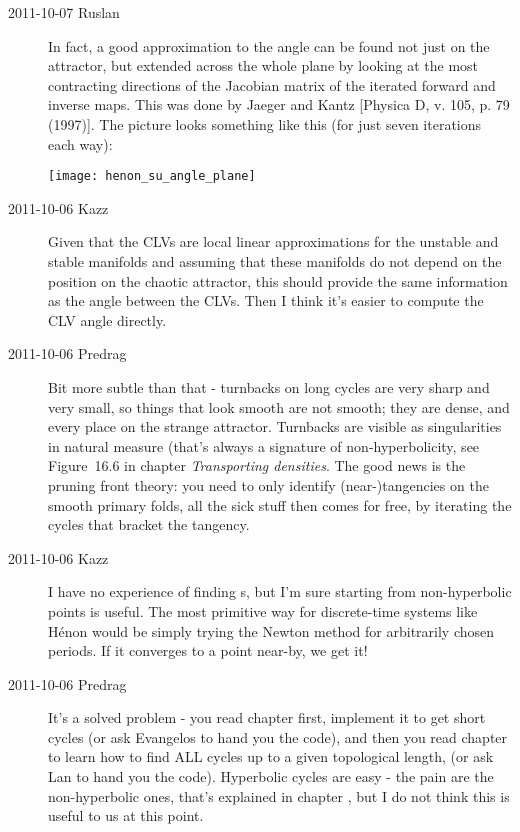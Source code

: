 \begin{description}
\item[2011-10-07 Ruslan] In fact, a good approximation to the angle can be found not just on the attractor, but extended across the whole plane by looking at the most contracting directions of the Jacobian matrix of the iterated forward and inverse maps.  This was done by Jaeger and Kantz [Physica D, v. 105, p. 79 (1997)].  The picture looks something like this (for just seven iterations each way):
    
    \texttt{[image: henon\_su\_angle\_plane]}
    

\item[2011-10-06 Kazz]
Given that the CLVs are local linear approximations for the unstable and
stable manifolds and assuming that these manifolds do not depend on the
position on the chaotic attractor, this should provide the same
information as the angle between the CLVs. Then I think it's easier to
compute the CLV angle directly.

\item[2011-10-06 Predrag]
Bit more subtle than that - turnbacks on long cycles are very sharp and
very small, so things that look smooth are not smooth; they are dense,
and every place on the strange attractor. Turnbacks are visible as
singularities in natural measure (that's always a signature of
non-hyperbolicity, see Figure~16.6 in
 chapter
{\em Transporting densities}. The good news is the pruning front theory:
you need to only identify (near-)tangencies on the smooth primary folds,
all the sick stuff then comes for free, by iterating the cycles that
bracket the tangency.

\item[2011-10-06 Kazz]
I have no experience of finding \po s, but I'm sure starting from
non-hyperbolic points is useful. The most primitive way for discrete-time
systems like H\'enon would be simply trying the Newton method for
arbitrarily chosen periods. If it converges to a point near-by, we get
it!

\item[2011-10-06 Predrag]
It's a solved problem - you read chapter
 first, implement it to get short cycles (or ask Evangelos to
hand you the code), and then you read chapter
to learn how to find ALL cycles up to a given topological length, (or ask
Lan to hand you the code). Hyperbolic cycles are easy - the pain are the
non-hyperbolic ones, that's explained in chapter
, but I do
not think this is useful to us at this point.


\end{description}
